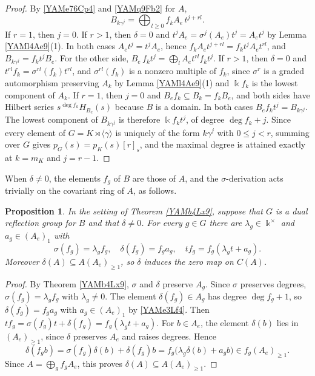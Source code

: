 \documentclass[reqno]{amsart}
\numberwithin{equation}{section}
\newtheorem{proposition}[equation]{Proposition}
\theoremstyle{definition}
\theoremstyle{remark}
\theoremstyle{plain}
\newcommand{\kk}{\Bbbk}
\begin{document}
\begin{proof}
By \eqref{YAMe76Cp4} and \eqref{YAMq9Fb2} for $A$,
\[
B_{k\gamma^j}=\bigoplus_{l\ge0}f_kA_e\,t^{j+rl}.
\]
If $r=1$, then $j=0$. If $r>1$, then $\delta=0$ and $t^jA_e=\sigma^j(A_e)t^j=A_et^j$ by Lemma \ref{YAMl4Ae9}(1). In both cases $A_et^j=t^jA_e$, hence $f_kA_et^{j+rl}=f_kt^jA_et^{rl}$, and $B_{k\gamma^j}=f_kt^jB_e$. For the other side, $B_e\,f_kt^j=\bigoplus_lA_et^{rl}f_kt^j$. If $r>1$, then $\delta=0$ and $t^{rl}f_k=\sigma^{rl}(f_k)t^{rl}$, and $\sigma^{rl}(f_k)$ is a nonzero multiple of $f_k$, since $\sigma^r$ is a graded automorphism preserving $A_k$ by Lemma \ref{YAMl4Ae9}(1) and $\kk f_k$ is the lowest component of $A_k$. If $r=1$, then $j=0$ and $B_ef_k\subseteq B_k=f_kB_e$, and both sides have Hilbert series $s^{\deg f_k}H_{B_e}(s)$ because $B$ is a domain. In both cases $B_ef_kt^j=B_{k\gamma^j}$. The lowest component of $B_{k\gamma^j}$ is therefore $\kk f_kt^j$, of degree $\deg f_k+j$. Since every element of $G=K\rtimes\langle\gamma\rangle$ is uniquely of the form $k\gamma^j$ with $0\le j<r$, summing over $G$ gives $p_G(s)=p_K(s)[r]_s$, and the maximal degree is attained exactly at $k=m_K$ and $j=r-1$.
\end{proof}

When $\delta\neq0$, the elements $f_g$ of $B$ are those of $A$, and the $\sigma$-derivation acts trivially on the covariant ring of $A$, as follows.

\begin{proposition}\label{YAMet9Lw3}
In the setting of Theorem \ref{YAMb4Lx9}, suppose that $G$ is a dual reflection group for $B$ and that $\delta\neq0$. For every $g\in G$ there are $\lambda_g\in\kk^\times$ and $a_g\in(A_e)_1$ with
\begin{equation}\label{YAMe36Et1}
\sigma(f_g)=\lambda_gf_g,\quad\delta(f_g)=f_ga_g,\quad tf_g=f_g(\lambda_gt+a_g).
\end{equation}
Moreover $\delta(A)\subseteq A(A_e)_{\ge1}$, so $\delta$ induces the zero map on $C(A)$.
\end{proposition}

\begin{proof}
By Theorem \ref{YAMb4Lx9}, $\sigma$ and $\delta$ preserve $A_g$. Since $\sigma$ preserves degrees, $\sigma(f_g)=\lambda_gf_g$ with $\lambda_g\neq0$. The element $\delta(f_g)\in A_g$ has degree $\deg f_g+1$, so $\delta(f_g)=f_ga_g$ with $a_g\in(A_e)_1$ by \eqref{YAMe3Lf4}. Then $tf_g=\sigma(f_g)t+\delta(f_g)=f_g(\lambda_gt+a_g)$. For $b\in A_e$, the element $\delta(b)$ lies in $(A_e)_{\ge1}$, since $\delta$ preserves $A_e$ and raises degrees. Hence
\[
\delta(f_gb)=\sigma(f_g)\delta(b)+\delta(f_g)b=f_g\big(\lambda_g\delta(b)+a_gb\big)\in f_g(A_e)_{\ge1}.
\]
Since $A=\bigoplus_gf_gA_e$, this proves $\delta(A)\subseteq A(A_e)_{\ge1}$.
\end{proof}
\end{document}
